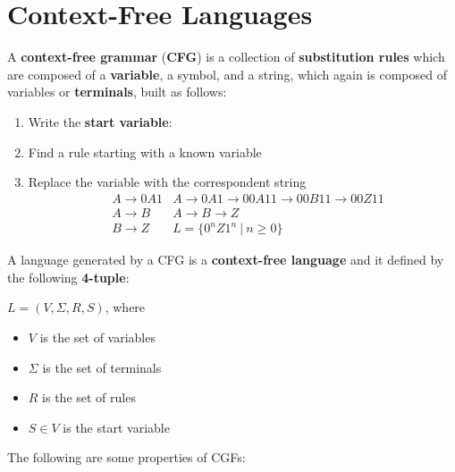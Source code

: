 \documentclass{article}
\begin{document}
\section{Context-Free Languages}
A \textbf{context-free grammar} (\textbf{CFG}) is a collection of \textbf{substitution rules} which are composed of a \textbf{variable}, a symbol, and a string, which again is composed of variables or \textbf{terminals}, built as follows:
\begin{enumerate}
    \item Write the \textbf{start variable}:
    \item Find a rule starting with a known variable
    \item Replace the variable with the correspondent string
        \begin{align*}
            &A \rightarrow 0A1 &A\rightarrow0A1 \rightarrow00A11\rightarrow00B11\rightarrow00Z11 \\
            &A \rightarrow B &A\rightarrow B\rightarrow Z \\
            &B \rightarrow Z &L = \{0^nZ1^n \ | \ n\geq0\}
        \end{align*}
\end{enumerate}
A language generated by a CFG is a \textbf{context-free language} and it defined by the following \textbf{4-tuple}:
\begin{center}
    $L = (V,\Sigma, R, S)$, where
\end{center}
\begin{itemize}
    \item $V$ is the set of variables
    \item $\Sigma$ is the set of terminals
    \item $R$ is the set of rules
    \item $S \in V$ is the start variable
\end{itemize}
The following are some properties of CGFs:
\end{document}

